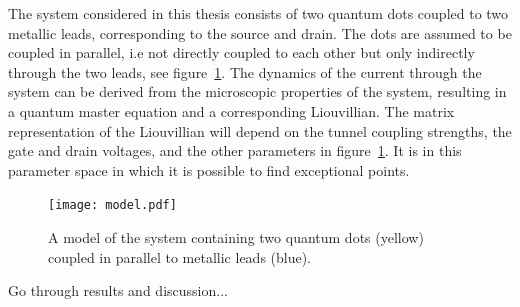 \documentclass[../main.tex]{subfiles}
\begin{document}
The system considered in this thesis consists of two quantum dots coupled to two metallic leads, corresponding to the source and drain. The dots are assumed to be coupled in parallel, i.e not directly coupled to each other but only indirectly through the two leads, see figure~\ref{fig:model}. The dynamics of the current through the system can be derived from the microscopic properties of the system, resulting in a quantum master equation and a corresponding Liouvillian. The matrix representation of the Liouvillian will depend on the tunnel coupling strengths, the gate and drain voltages, and the other parameters in figure~\ref{fig:model}. It is in this parameter space in which it is possible to find exceptional points.

\begin{figure}[H]
    \centering
    \texttt{[image: model.pdf]}
    \caption{A model of the system containing two quantum dots (yellow) coupled in parallel to metallic leads (blue).}
    \label{fig:model}
\end{figure}

Go through results and discussion...
\end{document}
